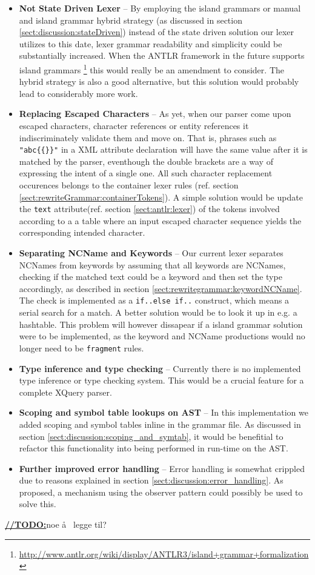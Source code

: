 \begin{itemize}
\item \textbf{Not State Driven Lexer} -- By employing the island grammars or
manual and island grammar hybrid strategy (as discussed in section
\ref{sect:discussion:stateDriven}) instead of the state driven solution our
lexer utilizes to this date, lexer grammar readability and simplicity could be
substantially increased. When the ANTLR framework in the future supports island
grammars
\footnote{\url{http://www.antlr.org/wiki/display/ANTLR3/island+grammar+formalization}}
this would really be an amendment to consider. The hybrid strategy is also a
good alternative, but this solution would probably lead to considerably more
work.

\item \textbf{Replacing Escaped Characters} -- As yet, when our parser come
upon escaped characters, character references or entity references it
indiscriminately validate them and move on. That is, phrases such as
\verb!"abc{{}}"! in a XML attribute declaration will have the same value after
it is matched by the parser, eventhough the double brackets are a way of
expressing the intent of a single one. All such character replacement
occurences belongs to the container lexer rules (ref. section
\ref{sect:rewriteGrammar:containerTokens}). A simple solution would be update
the \verb!text! attribute(ref. section \ref{sect:antlr:lexer}) of the tokens
involved according to a a table where an input escaped character sequence
yields the corresponding intended character.

\item \textbf{Separating NCName and Keywords} -- Our current lexer separates
NCNames from keywords by assuming that all keywords are NCNames, checking if
the matched text could be a keyword and then set the type accordingly, as
described in section \ref{sect:rewritegrammar:keywordNCName}. The check is
implemented as a \verb!if..else if..! construct, which means a serial search
for a match. A better solution would be to look it up in e.g. a hashtable. This
problem will however dissapear if a island grammar solution were to be
implemented, as the keyword and NCName productions would no longer need to be
\verb!fragment! rules.

\item \textbf{Type inference and type checking} -- Currently there is no
implemented type inference or type checking system. This would be a crucial
feature for a complete XQuery parser.

\item \textbf{Scoping and symbol table lookups on AST} -- In this implementation
we added scoping and symbol tables inline in the grammar file. As discussed in
section \ref{sect:discussion:scoping_and_symtab}, it would be benefitial to
refactor this functionality into being performed in run-time on the AST.

\item \textbf{Further improved error handling} -- Error handling is somewhat
crippled due to reasons explained in section
\ref{sect:discussion:error_handling}. As proposed, a mechanism using the
observer pattern could possibly be used to solve this.

\end{itemize}
\underline{\textbf{\LARGE //TODO:}}noe \aa~ legge til?




